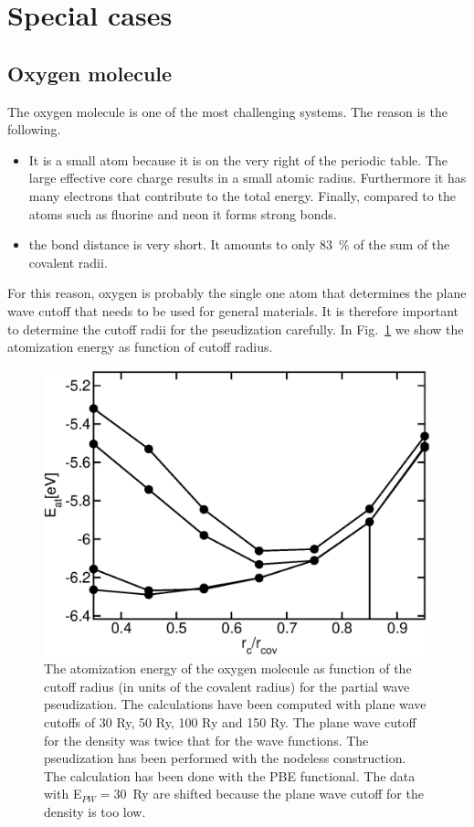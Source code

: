 \documentclass[11pt,a4paper]{report}
\begin{document}
\section{Special cases}
\subsection{Oxygen molecule}
The oxygen molecule is one of the most challenging systems. The reason
is the following.
\begin{itemize}
\item It is a small atom because it is on the very right of the
  periodic table. The large effective core charge results in a small
  atomic radius. Furthermore it has many electrons that contribute to
  the total energy. Finally, compared to the atoms such as fluorine
  and neon it forms strong bonds.
\item the bond distance is very short. It amounts to only 83~\% of the
  sum of the covalent radii.
\end{itemize}
For this reason, oxygen is probably the single one atom that
determines the plane wave cutoff that needs to be used for general
materials.  It is therefore important to determine the cutoff radii
for the pseudization carefully. In Fig.~\ref{o2_eatinev_ndlssofrad} we
show the atomization energy as function of cutoff radius. 

\begin{figure}[h!]
\begin{center}
\includegraphics[width=0.5\linewidth,clip=true]
{Figs/O2_atomizationenergy/eofrc.eps}
\end{center}
\caption{\label{o2_eatinev_ndlssofrad}The atomization energy of the
  oxygen molecule as function of the cutoff radius (in units of the
  covalent radius) for the partial wave pseudization. The calculations
  have been computed with plane wave cutoffs of 30 Ry, 50 Ry, 100 Ry
  and 150 Ry. The plane wave cutoff for the density was twice that for
  the wave functions. The pseudization has been performed with the
  nodeless construction. The calculation has been done with the PBE
  functional. The data with E$_{PW}=30$~Ry are shifted because the
  plane wave cutoff for the density is too low.}
\end{figure}
\end{document}
